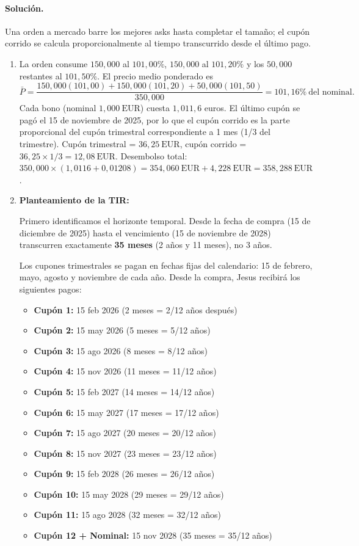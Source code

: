 \documentclass[12pt,a4paper]{article}
\newcommand{\EUR}[1]{\ensuremath{#1~\text{EUR}}}
\newenvironment{solucion}{\paragraph{Solución.}}{}
\begin{document}
\begin{solucion}
Una orden a mercado barre los mejores asks hasta completar el tamaño; el cupón corrido se calcula proporcionalmente al tiempo transcurrido desde el último pago.
\begin{enumerate}[label=\alph*)]
  \item La orden consume \(150{,}000\) al \(101{,}00\%\), \(150{,}000\) al \(101{,}20\%\) y los \(50{,}000\) restantes al \(101{,}50\%\). El precio medio ponderado es
  \[
  \bar{P} = \frac{150{,}000(101{,}00)+150{,}000(101{,}20)+50{,}000(101{,}50)}{350{,}000} = 101{,}16\%\ \text{del nominal}.
  \]
  Cada bono (nominal \EUR{1{,}000}) cuesta \(1{,}011{,}6\) euros. El último cupón se pagó el 15 de noviembre de 2025, por lo que el cupón corrido es la parte proporcional del cupón trimestral correspondiente a 1 mes (1/3 del trimestre). Cupón trimestral = \EUR{36{,}25}, cupón corrido = \(36{,}25 \times 1/3 = \EUR{12{,}08}\). Desembolso total: \(350{,}000 \times (1{,}0116 + 0{,}01208) = \EUR{354{,}060} + \EUR{4{,}228} = \EUR{358{,}288}\).
  \item \textbf{Planteamiento de la TIR:}
  
  Primero identificamos el horizonte temporal. Desde la fecha de compra (15 de diciembre de 2025) hasta el vencimiento (15 de noviembre de 2028) transcurren exactamente \textbf{35 meses} (2 años y 11 meses), no 3 años.
  
  Los cupones trimestrales se pagan en fechas fijas del calendario: 15 de febrero, mayo, agosto y noviembre de cada año. Desde la compra, Jesus recibirá los siguientes pagos:
  
  \begin{itemize}
    \item \textbf{Cupón 1:} 15 feb 2026 (2 meses = 2/12 años después)
    \item \textbf{Cupón 2:} 15 may 2026 (5 meses = 5/12 años)
    \item \textbf{Cupón 3:} 15 ago 2026 (8 meses = 8/12 años)
    \item \textbf{Cupón 4:} 15 nov 2026 (11 meses = 11/12 años)
    \item \textbf{Cupón 5:} 15 feb 2027 (14 meses = 14/12 años)
    \item \textbf{Cupón 6:} 15 may 2027 (17 meses = 17/12 años)
    \item \textbf{Cupón 7:} 15 ago 2027 (20 meses = 20/12 años)
    \item \textbf{Cupón 8:} 15 nov 2027 (23 meses = 23/12 años)
    \item \textbf{Cupón 9:} 15 feb 2028 (26 meses = 26/12 años)
    \item \textbf{Cupón 10:} 15 may 2028 (29 meses = 29/12 años)
    \item \textbf{Cupón 11:} 15 ago 2028 (32 meses = 32/12 años)
    \item \textbf{Cupón 12 + Nominal:} 15 nov 2028 (35 meses = 35/12 años)
  \end{itemize}
  

\end{enumerate}
\end{solucion}
\end{document}

